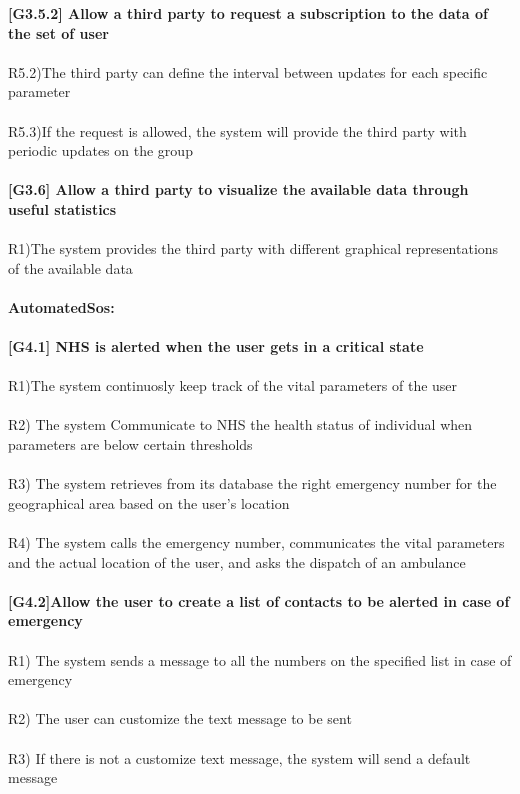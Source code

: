 \textbf{[G3.5.2] Allow a third party to request a subscription to the data of the set of user} \\ \\
R5.2)The third party can define the interval between updates for each specific parameter \\ \\
R5.3)If the request is allowed, the system will provide the third party with periodic updates on the group \\ \\ 
\textbf{[G3.6] Allow a third party to visualize the available data through useful statistics} \\ \\
R1)The system provides the third party with different graphical representations of the available data \\ \\

\textbf{AutomatedSos:} \\ \\ 
\textbf{[G4.1] NHS is alerted when the user gets in a critical state} \\ \\
R1)The system continuosly keep track of the vital parameters of the user \\ \\
R2) The system Communicate to NHS the health status of individual when parameters are below certain thresholds \\ \\
R3) The system retrieves from its database the right emergency number for the geographical area based on the user’s location \\ \\
R4) The system calls the emergency number, communicates the vital parameters and the actual location of the user, and asks the dispatch of an ambulance \\ \\
\textbf{[G4.2]Allow the user to create a list of contacts to be alerted  in case of emergency} \\ \\
R1) The system sends a message to all the numbers on the specified list in case of emergency \\ \\
R2) The user can customize the  text message to be sent \\ \\
R3) If there is not a customize text message, the system will send a default message \\ \\

